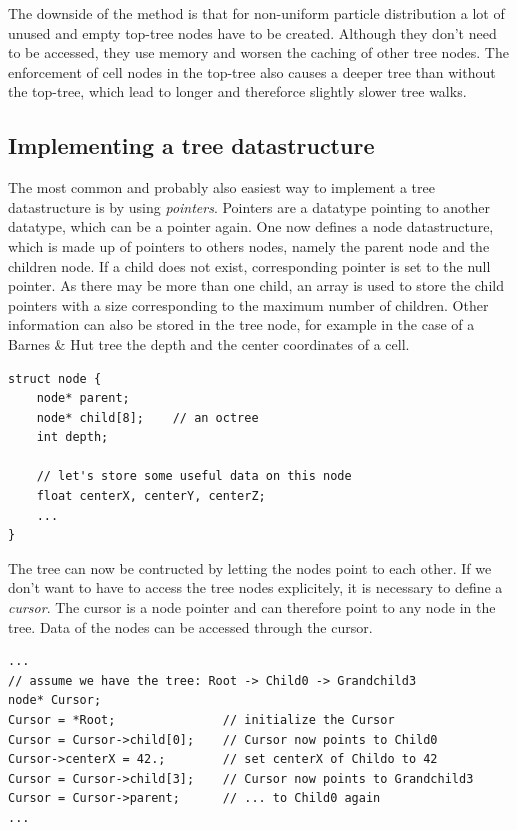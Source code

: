 The downside of the method is that for non-uniform particle distribution a lot of unused and empty top-tree nodes have to be created. Although they don't need to be accessed, they use memory and worsen the caching of other tree nodes. The enforcement of cell nodes in the top-tree also causes a deeper tree than without the top-tree, which lead to longer and thereforce slightly slower tree walks.\\

\subsection{Implementing a tree datastructure}
The most common and probably also easiest way to implement a tree datastructure is by using \emph{pointers}. Pointers are a datatype pointing to another datatype, which can be a pointer again. One now defines a node datastructure, which is made up of pointers to others nodes, namely the parent node and the children node. If a child does not exist, corresponding pointer is set to the null pointer. As there may be more than one child, an array is used to store the child pointers with a size corresponding to the maximum number of children. Other information can also be stored in the tree node, for example in the case of a Barnes \& Hut tree the depth and the center coordinates of a cell.
\begin{verbatim}
struct node {
    node* parent;
    node* child[8];    // an octree
    int depth;
    
    // let's store some useful data on this node
    float centerX, centerY, centerZ;
    ...
}
\end{verbatim}

The tree can now be contructed by letting the nodes point to each other. If we don't want to have to access the tree nodes explicitely, it is necessary to define a \emph{cursor}. The cursor is a node pointer and can therefore point to any node in the tree. Data of the nodes can be accessed through the cursor. 
\begin{verbatim}
...
// assume we have the tree: Root -> Child0 -> Grandchild3
node* Cursor;
Cursor = *Root;               // initialize the Cursor
Cursor = Cursor->child[0];    // Cursor now points to Child0
Cursor->centerX = 42.;        // set centerX of Childo to 42
Cursor = Cursor->child[3];    // Cursor now points to Grandchild3
Cursor = Cursor->parent;      // ... to Child0 again
...
\end{verbatim}

